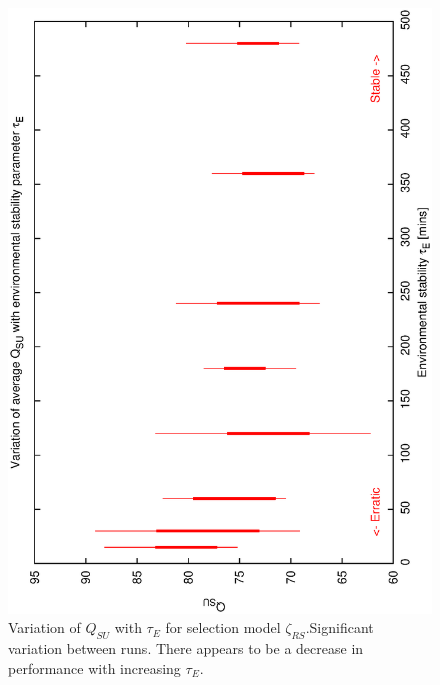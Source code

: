 \begin{figure}[h]
 \begin{center}
 \includegraphics[scale=0.5, angle=-90]{figures/biasrs_de.eps}
 \caption[Variation of $Q_{SU}$ with $\tau_E$ for selection model $\zeta_{RS}$.] 
   {Variation of $Q_{SU}$ with $\tau_E$ for selection model $\zeta_{RS}$.Significant variation between runs. There appears to be a decrease in performance with increasing $\tau_E$.}
\label{fig:qsu_de_biasrs}
\end{center}
\end{figure}


